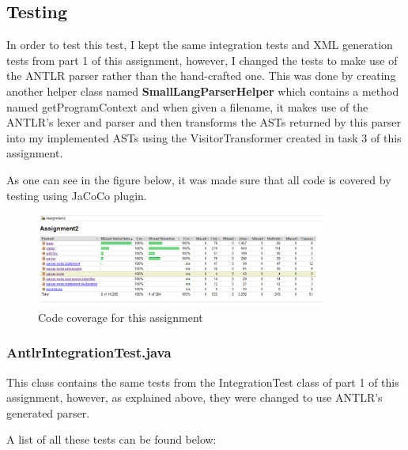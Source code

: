 \documentclass{article}
\begin{document}
				
				\subsection{Testing}
				
				In order to test this test, I kept the same integration tests and XML generation tests from part 1 of this assignment, however, I changed the tests to make use of the ANTLR parser rather than the hand-crafted one. This was done by creating another helper class named \textbf{SmallLangParserHelper} which contains a method named getProgramContext and when given a filename, it makes use of the ANTLR's lexer and parser and then transforms the ASTs returned by this parser into my implemented ASTs using the VisitorTransformer created in task 3 of this assignment.
				
				As one can see in the figure below, it was made sure that all code is covered by testing using JaCoCo plugin.
				
										\begin{figure}[H]
					\centering
			 			\includegraphics[width=0.85\textwidth]{jacoco2.png}
			  			\caption{Code coverage for this assignment}
			  			\label{fig:jacoco}
					\end{figure}
					
					\pagebreak
					
					\subsubsection{AntlrIntegrationTest.java}
					
					This class contains the same tests from the IntegrationTest class of part 1 of this assignment, however, as explained above, they were changed to use ANTLR's generated parser.
					
					A list of all these tests can be found below:
					
\end{document}
